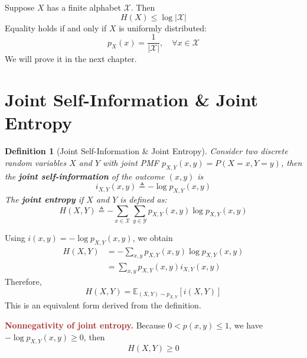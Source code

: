 \documentclass[11pt]{report}
\theoremstyle{lecturedefinition}
\newtheorem{definition}{Definition}
\theoremstyle{lectureremark}
\begin{document}
\begin{property}
Suppose $X$ has a finite alphabet $\mathcal{X}$. Then
\begin{equation*}
    H(X)\le \log |\mathcal{X}|
\end{equation*}
Equality holds if and only if $X$ is uniformly distributed:
\begin{equation*}
    p_X(x)=\frac{1}{|\mathcal{X}|},\quad\forall x\in\mathcal{X}
\end{equation*}
\tcblower
We will prove it in the next chapter.
\end{property}

\section{Joint Self-Information \& Joint Entropy}
\begin{definition}[Joint Self-Information \& Joint Entropy]
    Consider two discrete random variables $X$ and $Y$ with joint PMF $p_{X,Y}(x,y)=P(X=x, Y=y)$, then the \textbf{joint self-information} of the outcome $(x,y)$ is
    \begin{equation*}
        i_{X,Y}(x,y)\triangleq-\log p_{X,Y}(x,y)
    \end{equation*}
    The \textbf{joint entropy} if $X$ and $Y$ is defined as:
    \begin{equation*}
        H(X,Y)\triangleq-\sum_{x\in\mathcal{X}}\sum_{y\in\mathcal{Y}}p_{X,Y}(x,y)\log p_{X,Y}(x,y)
    \end{equation*}
\end{definition}
Using $i(x,y)=-\log p_{X,Y}(x,y)$, we obtain
\begin{equation*}
    \begin{aligned}
        H(X,Y)&=-\sum_{x,y}p_{X,Y}(x,y)\log p_{X,Y}(x,y)\\
        &=\sum_{x,y}p_{X,Y}(x,y)i_{X,Y}(x,y)
    \end{aligned}
\end{equation*}
Therefore,
\begin{equation}
    H(X,Y)=\mathbb{E}_{(X,Y)\sim p_{X,Y}}[i(X,Y)]
\end{equation}
This is an equivalent form derived from the definition.

\textbf{\textcolor{brown}{Nonnegativity of joint entropy.}} Because $0<p(x,y)\le 1$, we have $-\log p_{X,Y}(x,y)\ge 0$, then
\begin{equation}
    H(X,Y)\ge 0
\end{equation}
\end{document}
